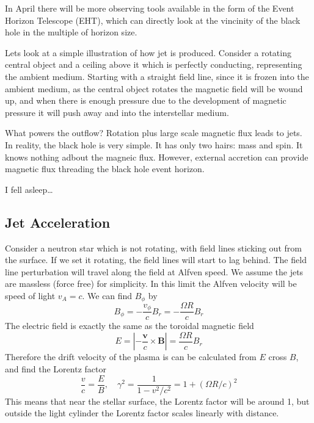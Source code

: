 \documentclass[letterpaper, 11pt]{article}
\numberwithin{equation}{section}
\numberwithin{figure}{section}
\begin{document}
In April there will be more observing tools available in the form of the Event
Horizon Telescope (EHT), which can directly look at the vincinity of the black
hole in the multiple of horizon size.

Lets look at a simple illustration of how jet is produced. Consider a rotating
central object and a ceiling above it which is perfectly conducting,
representing the ambient medium. Starting with a straight field line, since it
is frozen into the ambient medium, as the central object rotates the magnetic
field will be wound up, and when there is enough pressure due to the development of
magnetic pressure it will push away and into the interstellar medium.

What powers the outflow? Rotation plus large scale magnetic flux leads to jets.
In reality, the black hole is very simple. It has only two hairs: mass and spin.
It knows nothing adbout the magneic flux. However, external accretion can
provide magnetic flux threading the black hole event horizon.

I fell asleep\dots

\subsection{Jet Acceleration}

Consider a neutron star which is not rotating, with field lines sticking out
from the surface. If we set it rotating, the field lines will start to lag
behind. The field line perturbation will travel along the field at Alfven speed.
We assume the jets are massless (force free) for simplicity. In this limit the
Alfven velocity will be speed of light $v_{A} = c$. We can find $B_{\phi}$ by
\begin{equation}
  \label{eq:1}
  B_{\phi} = -\frac{v_{\phi}}{c}B_{r} = -\frac{\Omega R}{c}B_{r}
\end{equation}
The electric field is exactly the same as the toroidal magnetic field
\begin{equation}
  \label{eq:2}
  E = \left| -\frac{\mathbf{v}}{c}\times \mathbf{B} \right| = \frac{\Omega R}{c} B_r
\end{equation}
Therefore the drift velocity of the plasma is can be calculated from $E$ cross
$B$, and find the Lorentz factor
\begin{equation}
  \label{eq:3}
  \frac{v}{c} = \frac{E}{B}, \quad\gamma^2 = \frac{1}{1 - v^2/c^2} = 1 + (\Omega R/c)^2
\end{equation}
This means that near the stellar surface, the Lorentz factor will be around 1,
but outside the light cylinder the Lorentz factor scales linearly with distance.
\end{document}
